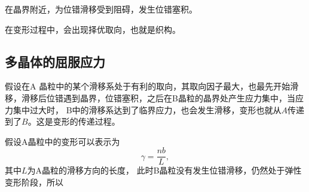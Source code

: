             在晶界附近，为位错滑移受到阻碍，发生位错塞积。

            在变形过程中，会出现择优取向，也就是织构。
        \subsection{多晶体的屈服应力}
            假设在A 晶粒中的某个滑移系处于有利的取向，其取向因子最大，也最先开始滑
            移，滑移后位错遇到晶界，位错塞积，之后在B晶粒的晶界处产生应力集中，当应力集中过大时，
            B中的滑移系达到了临界应力，也会发生滑移，变形也就从$A$传递到了$B$。这是变形的传递过程。

            假设A晶粒中的变形可以表示为
            \begin{equation}
                \gamma=\frac{nb}{L},
            \end{equation}
            其中$L$为A晶粒的滑移方向的长度，
            此时B晶粒没有发生位错滑移，仍然处于弹性变形阶段，所以
